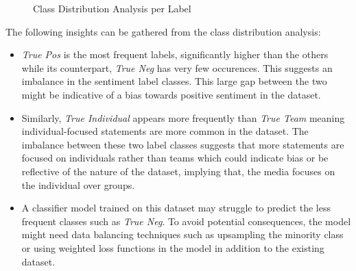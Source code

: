\documentclass[titlepage]{article}
\begin{document}
\begin{figure}[H]
  \caption{Class Distribution Analysis per Label}
  \label{fig:class_distribution}
\end{figure}

The following insights can be gathered from the class distribution analysis:
\begin{itemize}
  \item \emph{True Pos} is the most frequent labels, significantly
    higher than the others while its counterpart, \emph{True Neg} has
    very few occurences. This
    suggests an imbalance in the sentiment label classes. This large
    gap between the two might be indicative of a bias towards
    positive sentiment in the dataset.
  \item Similarly, \emph{True Individual} appears more frequently
    than \emph{True Team} meaning individual-focused statements are
    more common in the dataset. The
    imbalance between these two label classes suggests that more
    statements are focused on individuals rather than teams which
    could indicate bias or be reflective
    of the nature of the dataset, implying that, the media focuses on
    the individual over groups.
  \item A classifier model trained on this dataset may struggle to
    predict the less frequent classes such as \emph{True Neg}. To
    avoid potential consequences, the
    model might need data balancing techniques such as upsampling the
    minority class or using weighted loss functions in the model in
    addition to the existing dataset.
\end{itemize}
\end{document}
